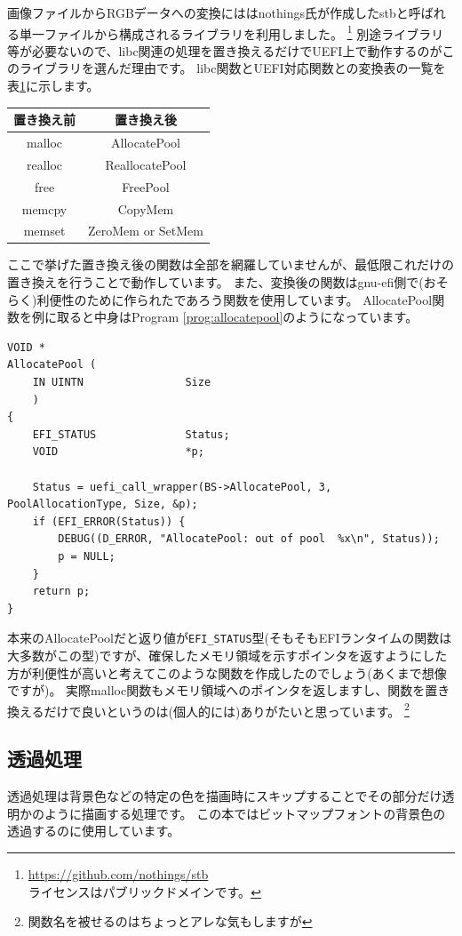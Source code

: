 \documentclass[10pt,b5paper,twoside,openany]{ltjsbook}
\begin{document}
画像ファイルからRGBデータへの変換にははnothings氏が作成したstbと呼ばれる単一ファイルから構成されるライブラリを利用しました。
\footnote{\url{https://github.com/nothings/stb} \\ ライセンスはパブリックドメインです。}
別途ライブラリ等が必要ないので、libc関連の処理を置き換えるだけでUEFI上で動作するのがこのライブラリを選んだ理由です。
libc関数とUEFI対応関数との変換表の一覧を表\ref{tb:function}に示します。
\begin{table}[H]
    \centering
    \begin{tabular}{|c|c|}
        \hline
        置き換え前 & 置き換え後 \\
        \hline
        malloc & AllocatePool \\
        realloc & ReallocatePool \\
        free & FreePool \\
        memcpy & CopyMem \\
        memset & ZeroMem or SetMem \\
        \hline
    \end{tabular}
    \label{tb:function}
\end{table}
ここで挙げた置き換え後の関数は全部を網羅していませんが、最低限これだけの置き換えを行うことで動作しています。
また、変換後の関数はgnu-efi側で(おそらく)利便性のために作られたであろう関数を使用しています。
AllocatePool関数を例に取ると中身はProgram \ref{prog:allocatepool}のようになっています。
\begin{lstlisting}[style=customC,caption=AllocatePool function,label=prog:allocatepool]
VOID *
AllocatePool (
    IN UINTN                Size
    )
{
    EFI_STATUS              Status;
    VOID                    *p;

    Status = uefi_call_wrapper(BS->AllocatePool, 3, PoolAllocationType, Size, &p);
    if (EFI_ERROR(Status)) {
        DEBUG((D_ERROR, "AllocatePool: out of pool  %x\n", Status));
        p = NULL;
    }
    return p;
}
\end{lstlisting}
本来のAllocatePoolだと返り値が\verb+EFI_STATUS+型(そもそもEFIランタイムの関数は大多数がこの型)ですが、確保したメモリ領域を示すポインタを返すようにした方が利便性が高いと考えてこのような関数を作成したのでしょう(あくまで想像ですが)。
実際malloc関数もメモリ領域へのポインタを返しますし、関数を置き換えるだけで良いというのは(個人的には)ありがたいと思っています。
\footnote{関数名を被せるのはちょっとアレな気もしますが}

\subsection{透過処理}
透過処理は背景色などの特定の色を描画時にスキップすることでその部分だけ透明かのように描画する処理です。
この本ではビットマップフォントの背景色の透過するのに使用しています。
\end{document}

